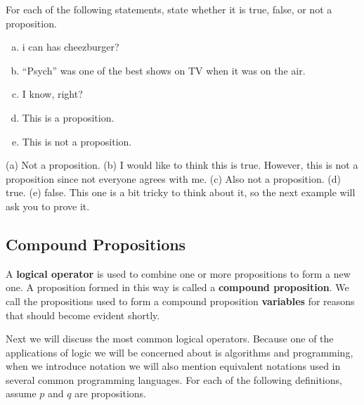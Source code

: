 \begin{exer}
For each of the following statements, state whether it is true, false, or not a proposition.\\[-.25in]
\begin{enumerate}[(a)]
\item {} i can has cheezburger?
\item {} ``Psych'' was one of the best shows on TV when it was on the air.
\item {} I know, right?
\item {} This is a proposition.
\item {} This is not a proposition.
\end{enumerate}
\begin{answer}
(a) Not a proposition.
(b) I would like to think this is true.  
However, this is not a proposition since not everyone agrees with me.
(c) Also not a proposition.  %
(d) true.
(e) false.  This one is a bit tricky to think about it, so the next example will ask you to prove it.
\end{answer}
\end{exer}

\subsection{Compound Propositions}

\begin{df}
A {\bf logical operator} is used to combine one or more
propositions to form a new one.  A proposition formed in this way is called
a {\bf compound proposition}.  
We call the propositions used to form a compound proposition {\bf variables}
for reasons that should become evident shortly.
\end{df}

Next we will discuss the most common logical operators.
Because one of the applications of logic we will be concerned
about is algorithms and programming, when we introduce
notation we will also mention equivalent notations used in 
several common programming languages.
For each of the following definitions, assume $p$ and $q$ are propositions.

